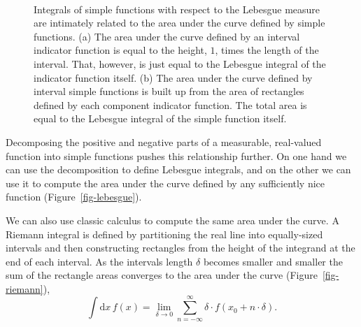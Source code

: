 \documentclass[
  letterpaper,
  DIV=11,
  numbers=noendperiod]{scrartcl}
\begin{document}
\begin{figure}
\begin{minipage}[t]{0.45\linewidth}
{{}

}

\subcaption{\label{fig-simple-area}}
\end{minipage}%
%
\begin{minipage}[t]{0.05\linewidth}

{\centering 

~

}

\end{minipage}%

\caption{\label{fig-integrate}Integrals of simple functions with respect
to the Lebesgue measure are intimately related to the area under the
curve defined by simple functions. (a) The area under the curve defined
by an interval indicator function is equal to the height, \(1\), times
the length of the interval. That, however, is just equal to the Lebesgue
integral of the indicator function itself. (b) The area under the curve
defined by interval simple functions is built up from the area of
rectangles defined by each component indicator function. The total area
is equal to the Lebesgue integral of the simple function itself.}

\end{figure}

Decomposing the positive and negative parts of a measurable, real-valued
function into simple functions pushes this relationship further. On one
hand we can use the decomposition to define Lebesgue integrals, and on
the other we can use it to compute the area under the curve defined by
any sufficiently nice function (Figure~\ref{fig-lebesgue}).

We can also use classic calculus to compute the same area under the
curve. A Riemann integral is defined by partitioning the real line into
equally-sized intervals and then constructing rectangles from the height
of the integrand at the end of each interval. As the intervals length
\(\delta\) becomes smaller and smaller the sum of the rectangle areas
converges to the area under the curve (Figure~\ref{fig-riemann}), \[
\int \mathrm{d} x \, f(x)
=
\lim_{\delta \rightarrow 0}
\sum_{n = -\infty}^{\infty} \delta \cdot f(x_{0} + n \cdot \delta).
\]
\end{document}
